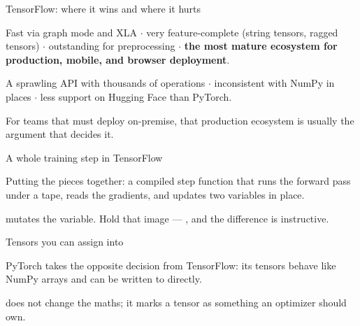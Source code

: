 \documentclass[aspectratio=169,11pt,t]{beamer}
\begin{document}
\begin{frame}[shrink=25]{TensorFlow: where it wins and where it hurts}
\begin{minipage}[t]{0.494\textwidth}
\begin{icardgood}
Fast via graph mode and XLA $\cdot$ very feature-complete (string tensors, ragged tensors) $\cdot$ outstanding  for preprocessing $\cdot$ \textbf{the most mature ecosystem for production, mobile, and browser deployment}.
\end{icardgood}
\end{minipage}%
\hfill
\begin{minipage}[t]{0.494\textwidth}
\begin{icardbad}
A sprawling API with thousands of operations $\cdot$ inconsistent with NumPy in places $\cdot$ less support on Hugging Face than PyTorch.
\end{icardbad}
\end{minipage}%
{\fontsize{9.4}{12.6}\selectfont\color{fg2}For teams that must deploy on-premise, that production ecosystem is usually the argument that decides it.\par}\vskip 4pt
\end{frame}

\begin{frame}[shrink=25]{A whole training step in TensorFlow}
{\fontsize{9.4}{12.6}\selectfont\color{fg2}Putting the pieces together: a compiled step function that runs the forward pass under a tape, reads the gradients, and updates two variables in place.\par}\vskip 4pt
\begin{iband}[signal]
 mutates the variable. Hold that image --- , and the difference is instructive.
\end{iband}
\end{frame}


\begin{frame}[shrink=25]{Tensors you can assign into}
{\fontsize{9.4}{12.6}\selectfont\color{fg2}PyTorch takes the opposite decision from TensorFlow: its tensors behave like NumPy arrays and can be written to directly.\par}\vskip 4pt
{\fontsize{9.4}{12.6}\selectfont\color{fg2} does not change the maths; it marks a tensor as something an optimizer should own.\par}\vskip 4pt
\end{frame}
\end{document}
